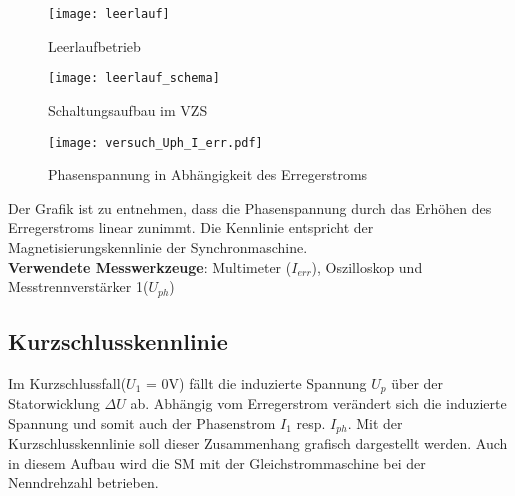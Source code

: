 \begin{flushleft}
\begin{figure}[H]
    \centering
        \texttt{[image: leerlauf]}
         \caption[]{Leerlaufbetrieb \footnotemark}
    \label{fig:abb1}
\end{figure}





\begin{figure}[H]
    \centering
        \texttt{[image: leerlauf\_schema]}
    \caption{Schaltungsaufbau im VZS}
    \label{fig:abb1}
\end{figure}









\newpage



\begin{figure}[H]
    \centering
        \texttt{[image: versuch\_Uph\_I\_err.pdf]}
    \caption{Phasenspannung in Abhängigkeit des Erregerstroms}
    \label{fig:abb1}
\end{figure}



Der Grafik ist zu entnehmen, dass die Phasenspannung durch das Erhöhen des Erregerstroms linear zunimmt. 
Die Kennlinie entspricht der Magnetisierungskennlinie der Synchronmaschine.\\


\vspace{0.4cm}
\textbf{Verwendete Messwerkzeuge}: Multimeter ($I_{err}$), Oszilloskop und\\ Messtrennverstärker 1($U_{ph}$)

\newpage






\subsection{Kurzschlusskennlinie}

Im Kurzschlussfall($U_1$ = 0V) fällt die induzierte Spannung $U_p$ über der Statorwicklung $\Delta U$ ab. Abhängig vom Erregerstrom verändert sich die induzierte Spannung und somit auch der Phasenstrom $I_1$ resp. $I_{ph}$.
Mit der Kurzschlusskennlinie soll dieser Zusammenhang grafisch dargestellt werden.
Auch in diesem Aufbau wird die SM mit der Gleichstrommaschine bei der Nenndrehzahl   betrieben.\\


\end{flushleft}
